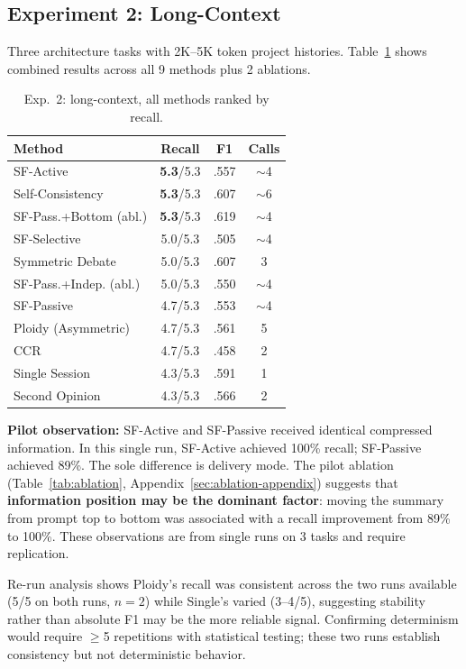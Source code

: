 \documentclass{article}
\begin{document}
\subsection{Experiment 2: Long-Context}
\label{sec:exp2}

Three architecture tasks with 2K--5K token project histories. Table~\ref{tab:exp2-main} shows combined results across all 9 methods plus 2 ablations.

\begin{table}[t]
\centering
\caption{Exp.~2: long-context, all methods ranked by recall.}
\label{tab:exp2-main}
\footnotesize
\begin{tabular}{@{}lccc@{}}
\toprule
\textbf{Method} & \textbf{Recall} & \textbf{F1} & \textbf{Calls} \\
\midrule
SF-Active & \textbf{5.3}/5.3 & .557 & $\sim$4 \\
Self-Consistency & \textbf{5.3}/5.3 & .607 & $\sim$6 \\
SF-Pass.+Bottom (abl.) & \textbf{5.3}/5.3 & .619 & $\sim$4 \\
SF-Selective & 5.0/5.3 & .505 & $\sim$4 \\
Symmetric Debate & 5.0/5.3 & .607 & 3 \\
SF-Pass.+Indep. (abl.) & 5.0/5.3 & .550 & $\sim$4 \\
SF-Passive & 4.7/5.3 & .553 & $\sim$4 \\
Ploidy (Asymmetric) & 4.7/5.3 & .561 & 5 \\
CCR & 4.7/5.3 & .458 & 2 \\
Single Session & 4.3/5.3 & .591 & 1 \\
Second Opinion & 4.3/5.3 & .566 & 2 \\
\bottomrule
\end{tabular}
\end{table}

\textbf{Pilot observation:} SF-Active and SF-Passive received identical compressed information. In this single run, SF-Active achieved 100\% recall; SF-Passive achieved 89\%. The sole difference is delivery mode. The pilot ablation (Table~\ref{tab:ablation}, Appendix~\ref{sec:ablation-appendix}) suggests that \textbf{information position may be the dominant factor}: moving the summary from prompt top to bottom was associated with a recall improvement from 89\% to 100\%. These observations are from single runs on 3 tasks and require replication.

Re-run analysis shows Ploidy's recall was consistent across the two runs available (5/5 on both runs, $n{=}2$) while Single's varied (3--4/5), suggesting stability rather than absolute F1 may be the more reliable signal. Confirming determinism would require $\geq$5 repetitions with statistical testing; these two runs establish consistency but not deterministic behavior.
\end{document}
